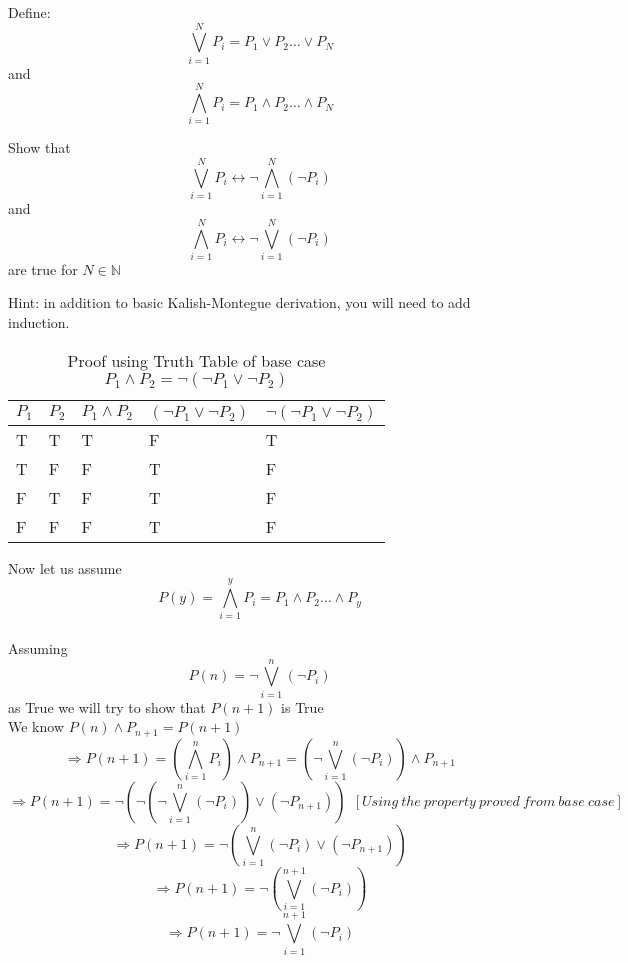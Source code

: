 \documentclass[10.5pt]{article}
\newenvironment{solution}[2][Solution]{ \begin{trivlist}
\item[\hskip \labelsep {\bfseries #1}]}{\end{trivlist}}
\newenvironment{problem}[2][Problem]{\begin{trivlist}
\item[\hskip \labelsep {\bfseries #1}\hskip \labelsep {\bfseries #2.}]}{\end{trivlist}}
\begin{document}
\vskip 0.5in
\pagebreak
\begin{problem}{7}
Define:
\[
\bigvee_{i = 1}^N P_i = P_1 \vee P_2 \ldots \vee P_N
\]
and
\[
\bigwedge_{i = 1}^N P_i = P_1 \wedge P_2 \ldots \wedge P_N
\]

Show that
\[
\bigvee_{i = 1}^N P_i \leftrightarrow \lnot \bigwedge_{i = 1}^N (\lnot P_i)
\]
and
\[
\bigwedge_{i = 1}^N P_i \leftrightarrow \lnot \bigvee_{i = 1}^N (\lnot P_i)
\]
are true for $N \in \mathbb{N}$

Hint: in addition to basic Kalish-Montegue derivation, you will need to add induction.
\end{problem}
\begin{solution}{7}
\item[]
\begin{table}[!h]
\centering
\caption{Proof using Truth Table of base case $P_{1} \wedge P_{2} = \lnot(\lnot P_{1} \vee \lnot P_{2})$}
\label{my-label}
\begin{tabular}{|l|l|l|l|l|}
\hline
$P_{1}$ & $P_{2}$ & $P_{1} \wedge P_{2}$ & $(\lnot P_{1} \vee \lnot P_{2})$ & $\lnot(\lnot P_{1} \vee \lnot P_{2})$ \\ \hline
T & T & T     & F                 & T                    \\ \hline
T & F & F     & T                 & F                    \\ \hline
F & T & F     & T                 & F                    \\ \hline
F & F & F     & T                 & F                    \\ \hline
\end{tabular}
\end{table}

Now let us assume $$P(y) =
\bigwedge_{i = 1}^y P_i = P_1 \wedge P_2 \ldots \wedge P_y$$\\
Assuming $$P(n) = \lnot \bigvee_{i = 1}^n (\lnot P_i)$$ as True we will try to show that $P(n+1)$ is True\\
We know $P(n) \wedge P_{n+1} = P(n+1)$
$$\Rightarrow P(n+1) = (\bigwedge_{i = 1}^n P_i) \wedge P_{n+1}  = (\lnot \bigvee_{i = 1}^n (\lnot P_i)) \wedge P_{n+1}$$
$$\Rightarrow P(n+1) = \lnot (\lnot (\lnot \bigvee_{i = 1}^n (\lnot P_i)) \vee (\lnot P_{n+1}))\ \  [Using\ the\ property\ proved\ from\ base\ case]$$
$$\Rightarrow P(n+1) = \lnot (\bigvee_{i = 1}^n (\lnot P_i) \vee (\lnot P_{n+1}))$$
$$\Rightarrow P(n+1) = \lnot (\bigvee_{i = 1}^{n+1} (\lnot P_i))$$
$$\Rightarrow P(n+1) = \lnot \bigvee_{i = 1}^{n+1} (\lnot P_i)$$


\end{solution}
\end{document}
